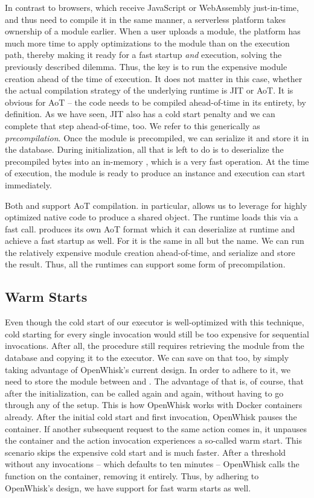 In contrast to browsers, which receive JavaScript or WebAssembly just-in-time, and thus need to compile it in the same manner, a serverless platform takes ownership of a module earlier. When a user uploads a module, the platform has much more time to apply optimizations to the module than on the execution path, thereby making it ready for a fast startup \emph{and} execution, solving the previously described dilemma. Thus, the key is to run the expensive module creation ahead of the time of execution. It does not matter in this case, whether the actual compilation strategy of the underlying runtime is JIT or AoT. It is obvious for AoT -- the code needs to be compiled ahead-of-time in its entirety, by definition. As we have seen, JIT also has a cold start penalty and we can complete that step ahead-of-time, too. We refer to this generically as \emph{precompilation}. Once the module is precompiled, we can serialize it and store it in the database. During initialization, all that is left to do is to deserialize the precompiled bytes into an in-memory , which is a very fast operation. At the time of execution, the module is ready to produce an instance and execution can start immediately.

Both  and  support AoT compilation.  in particular, allows us to leverage  for highly optimized native code to produce a shared object. The runtime loads this via a fast  call.  produces its own AoT format which it can deserialize at runtime and achieve a fast startup as well. For  it is the same in all but the name. We can run the relatively expensive module creation ahead-of-time, and serialize and store the result. Thus, all the runtimes can support some form of precompilation.

\subsection{Warm Starts}

Even though the cold start of our executor is well-optimized with this technique, cold starting for every single invocation would still be too expensive for sequential invocations. After all, the  procedure still requires retrieving the module from the database and copying it to the executor. We can save on that too, by simply taking advantage of OpenWhisk's current design. In order to adhere to it, we need to store the module between  and . The advantage of that is, of course, that after the initialization,  can be called again and again, without having to go through any of the setup. This is how OpenWhisk works with Docker containers already. After the initial cold start and first invocation, OpenWhisk pauses the container. If another subsequent request to the same action comes in, it unpauses the container and the action invocation experiences a so-called warm start. This scenario skips the expensive cold start and is much faster. After a threshold without any invocations -- which defaults to ten minutes -- OpenWhisk calls the  function on the container, removing it entirely.
Thus, by adhering to OpenWhisk's design, we have support for fast warm starts as well.

